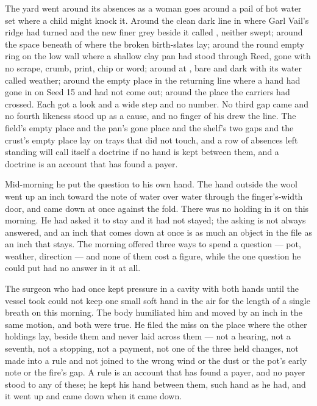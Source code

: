 \scenebreak

The yard went around its absences as a woman goes around a pail of hot water set where a child might knock it. Around the clean dark line in  where Garl Vail's ridge had turned and the new finer grey beside it called , neither swept; around the space beneath  of  where the broken birth-slates lay; around the round empty ring on the low wall where a shallow clay pan had stood through Reed, gone with no scrape, crumb, print, chip or word; around  at , bare and dark with its water called weather; around the empty place in the returning line where a hand had gone in on Seed 15 and had not come out; around the place the carriers had crossed. Each got a look and a wide step and no number. No third gap came and no fourth likeness stood up as a cause, and no finger of his drew the line. The field's empty place and the pan's gone place and the shelf's two gaps and the crust's empty place lay on trays that did not touch, and a row of absences left standing will call itself a doctrine if no hand is kept between them, and a doctrine is an account that has found a payer.

\scenebreak

Mid-morning he put the question to his own hand. The hand outside the wool went up an inch toward the note of water over water through the finger's-width door, and came down at once against the fold. There was no holding in it on this morning. He had asked it to stay and it had not stayed; the asking is not always answered, and an inch that comes down at once is as much an object in the file as an inch that stays. The morning offered three ways to spend a question --- pot, weather, direction --- and none of them cost a figure, while the one question he could put had no answer in it at all.

The surgeon who had once kept pressure in a cavity with both hands until the vessel took could not keep one small soft hand in the air for the length of a single breath on this morning. The body humiliated him and moved by an inch in the same motion, and both were true. He filed the miss on the place where the other holdings lay, beside them and never laid across them --- not a hearing, not a seventh, not a stopping, not a payment, not one of the three held changes, not made into a rule and not joined to the wrong wind or the dust or the pot's early note or the fire's gap. A rule is an account that has found a payer, and no payer stood to any of these; he kept his hand between them, such hand as he had, and it went up and came down when it came down.

